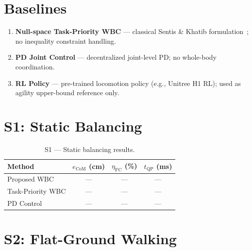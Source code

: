 \section{Baselines}
\label{sec:baselines}

\begin{enumerate}
  \item \textbf{Null-space Task-Priority WBC} — classical Sentis \& Khatib formulation~\cite{Sentis2005}; no inequality constraint handling.
  \item \textbf{PD Joint Control} — decentralized joint-level PD; no whole-body coordination.
  \item \textbf{RL Policy} — pre-trained locomotion policy (e.g., Unitree H1 RL); used as agility upper-bound reference only.
\end{enumerate}

\section{S1: Static Balancing}
\label{sec:s1}


\lipsum[33]

\begin{table}[htb]
  \centering
  \caption{S1 — Static balancing results.}
  \label{tab:s1-results}
  \begin{tabular}{lccc}
    \toprule
    \textbf{Method} & $e_{\mathrm{CoM}}$ (cm) & $\eta_{\mathrm{FC}}$ (\%) & $t_{\mathrm{QP}}$ (ms) \\
    \midrule
    Proposed WBC     & --- & --- & --- \\
    Task-Priority WBC & --- & --- & --- \\
    PD Control       & --- & --- & --- \\
    \bottomrule
  \end{tabular}
\end{table}

\begin{criticalinsight}
\end{criticalinsight}

\section{S2: Flat-Ground Walking}
\label{sec:s2}

